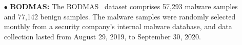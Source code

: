\documentclass[lettersize,journal]{IEEEtran}
\begin{document}
\begin{itemize}[leftmargin=*]
	
	\item[$\bullet$] \textbf{BODMAS:}
	The BODMAS~\cite{2021-PE-malware-dataset} dataset comprises 57,293 malware samples and 77,142 benign samples.
	The malware samples were randomly selected monthly from a security company's internal malware database, and data collection lasted from August 29, 2019, to September 30, 2020.
	

\end{itemize}
\end{document}

